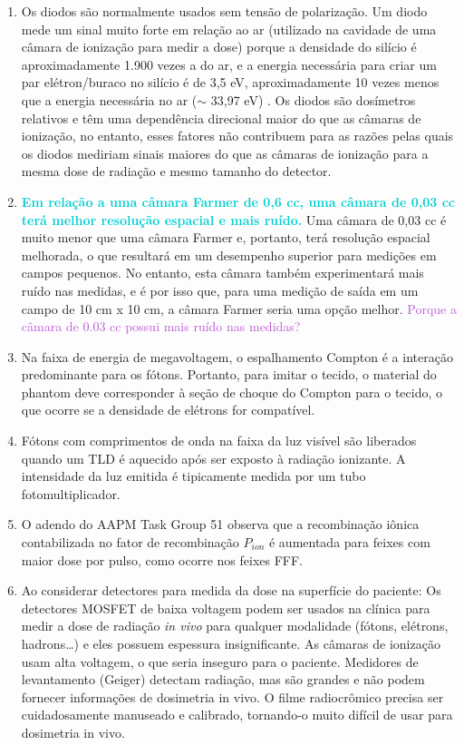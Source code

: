 \documentclass[11pt,a4paper]{article}
\begin{document}
\begin{enumerate}
        \item Os diodos são normalmente usados sem tensão de polarização. Um diodo mede um sinal muito forte em relação ao ar (utilizado na cavidade de uma câmara de ionização para medir a dose) porque a densidade do silício é aproximadamente 1.900 vezes a do ar, e a energia necessária para criar um par elétron/buraco no silício é de 3,5 eV, aproximadamente 10 vezes menos que a energia necessária no ar ($\sim$ 33,97 eV) . Os diodos são dosímetros relativos e têm uma dependência direcional maior do que as câmaras de ionização, no entanto, esses fatores não contribuem para as razões pelas quais os diodos mediriam sinais maiores do que as câmaras de ionização para a mesma dose de radiação e mesmo tamanho do detector. 

        \item \textcolor{DarkTurquoise}{\textbf{Em relação a uma câmara Farmer de 0,6 cc, uma câmara de 0,03 cc terá melhor resolução espacial e mais ruído.}} Uma câmara de 0,03 cc é muito menor que uma câmara Farmer e, portanto, terá resolução espacial melhorada, o que resultará em um desempenho superior para medições em campos pequenos. No entanto, esta câmara também experimentará mais ruído nas medidas, e é por isso que, para uma medição de saída em um campo de 10 cm x 10 cm, a câmara Farmer seria uma opção melhor. \textcolor{MediumOrchid}{Porque a câmara de 0.03 cc possui mais ruído nas medidas?}

        \item Na faixa de energia de megavoltagem, o espalhamento Compton é a interação predominante para os fótons. Portanto, para imitar o tecido, o material do phantom deve corresponder à seção de choque do Compton para o tecido, o que ocorre se a densidade de elétrons for compatível.

        \item Fótons com comprimentos de onda na faixa da luz visível são liberados quando um TLD é aquecido após ser exposto à radiação ionizante. A intensidade da luz emitida é tipicamente medida por um tubo fotomultiplicador.

        \item O adendo do AAPM Task Group 51 observa que a recombinação iônica contabilizada no fator de recombinação $P_{ion}$ é aumentada para feixes com maior dose por pulso, como ocorre nos feixes FFF.

        \item Ao considerar detectores para medida da dose na superfície do paciente: Os detectores MOSFET de baixa voltagem podem ser usados na clínica para medir a dose de radiação \textit{in vivo} para qualquer modalidade (fótons, elétrons, hadrons\dots) e eles possuem espessura insignificante. As câmaras de ionização usam alta voltagem, o que seria inseguro para o paciente. Medidores de levantamento (Geiger) detectam radiação, mas são grandes e não podem fornecer informações de dosimetria in vivo. O filme radiocrômico precisa ser cuidadosamente manuseado e calibrado, tornando-o muito difícil de usar para dosimetria in vivo.


\end{enumerate}
\end{document}
